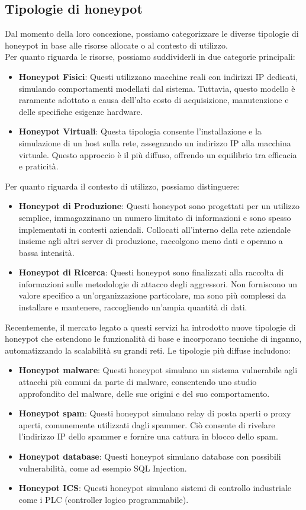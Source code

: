 \documentclass[12pt,a4paper,oneside,onecolumn,openright]{book}
\begin{document}
\subsection{Tipologie di honeypot}
Dal momento della loro concezione, possiamo categorizzare le diverse tipologie di 
honeypot in base alle risorse allocate o al contesto di utilizzo.\\
Per quanto riguarda le risorse, possiamo suddividerli in due categorie principali:
\begin{itemize}
	\item \textbf{Honeypot Fisici}: Questi utilizzano macchine reali con indirizzi IP 
	dedicati, simulando comportamenti modellati dal sistema. Tuttavia, questo modello 
	è raramente adottato a causa dell'alto costo di acquisizione, manutenzione e 
	delle specifiche esigenze hardware.
	\item \textbf{Honeypot Virtuali}: Questa tipologia consente l'installazione e la 
	simulazione di un host sulla rete, assegnando un indirizzo IP alla macchina virtuale. 
	Questo approccio è il più diffuso, offrendo un equilibrio tra efficacia e praticità.
\end{itemize}
Per quanto riguarda il contesto di utilizzo, possiamo distinguere:
\begin{itemize}
	\item \textbf{Honeypot di Produzione}: Questi honeypot sono progettati per un 
	utilizzo semplice, immagazzinano un numero limitato di informazioni e sono 
	spesso implementati in contesti aziendali. Collocati all'interno della rete 
	aziendale insieme agli altri server di produzione, raccolgono meno dati e 
	operano a bassa intensità.
	\item \textbf{Honeypot di Ricerca}: Questi honeypot sono finalizzati alla raccolta 
	di informazioni sulle metodologie di attacco degli aggressori. Non forniscono un 
	valore specifico a un'organizzazione particolare, ma sono più complessi da installare 
	e mantenere, raccogliendo un'ampia quantità di dati.
\end{itemize}
Recentemente, il mercato legato a questi servizi ha introdotto nuove tipologie 
di honeypot che estendono le funzionalità di base e incorporano tecniche di inganno, 
automatizzando la scalabilità su grandi reti. Le tipologie più diffuse includono:
\begin{itemize}
	\item \textbf{Honeypot malware}: Questi honeypot simulano un sistema vulnerabile 
	agli attacchi più comuni da parte di malware, consentendo uno studio approfondito 
	del malware, delle sue origini e del suo comportamento.
	\item \textbf{Honeypot spam}: Questi honeypot simulano relay di posta aperti o 
	proxy aperti, comunemente utilizzati dagli spammer. Ciò consente di rivelare 
	l'indirizzo IP dello spammer e fornire una cattura in blocco dello spam.
	\item \textbf{Honeypot database}: Questi honeypot simulano database con 
	possibili vulnerabilità, come ad esempio SQL Injection.
	\item \textbf{Honeypot ICS}: Questi honeypot simulano sistemi di controllo industriale 
	come i PLC (controller logico programmabile).
\end{itemize}
\end{document}
